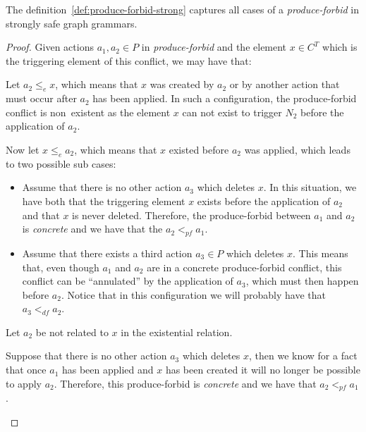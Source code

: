 \begin{thm} The definition~\ref{def:produce-forbid-strong} captures all cases of a \emph{produce-forbid} in strongly safe graph grammars.
\end{thm}

\begin{proof} Given actions $a_1,a_2 \in P$ in \emph{produce-forbid} and the element $x \in C^T$ which is the triggering element of this conflict, we may have that:
\hfill

\begin{description}[style=nextline,leftmargin=*]
  \item[Triggering element is related to the action:]
    Let $a_2 \leq_e x$, which means that $x$ was created by $a_2$ or by another action that must occur after $a_2$ has been applied. In such a configuration, the produce-forbid conflict is \mbox{non existent} as the element $x$ can not exist to trigger $N_2$ before the application of $a_2$.

    Now let $x \leq_e a_2$, which means that $x$ existed before $a_2$ was applied, which leads to two possible sub cases:

    \begin{itemize}
      \item Assume that there is no other action $a_3$ which deletes $x$. In this situation, we have both that the triggering element $x$ exists before the application of $a_2$ and that $x$ is never deleted. Therefore, the produce-forbid between $a_1$ and $a_2$ is \emph{concrete} and we have that the $a_2 <_{pf} a_1$.
      \item Assume that there exists a third action $a_3 \in P$ which deletes $x$. This means that, even though $a_1$ and $a_2$ are in a concrete produce-forbid conflict, this conflict can be ``annulated'' by the application of $a_3$, which must then happen before $a_2$. Notice that in this configuration we will probably have that $a_3 <_{df} a_2$.
    \end{itemize}

  \item[Triggering element is not related to the action:]
    Let $a_2$ be not related to $x$ in the existential relation.

    Suppose that there is no other action $a_3$ which deletes $x$, then we know for a fact that once $a_1$ has been applied and $x$ has been created it will no longer be possible to apply $a_2$. Therefore, this produce-forbid is \emph{concrete} and we have that $a_2 <_{pf} a_1$.


\end{description}
\end{proof}

